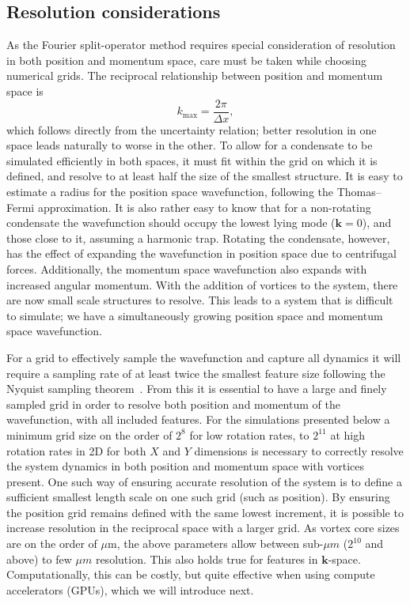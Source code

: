 \subsection{Resolution considerations}
As the Fourier split-operator method requires special consideration of resolution in both position and momentum space, care must be taken while choosing numerical grids. The reciprocal relationship between position and momentum space is \begin{equation}
    k_{\text{max}} = \frac{2\pi}{\Delta x},
\end{equation}
which follows directly from the uncertainty relation; better resolution in one space leads naturally to worse in the other. To allow for a condensate to be simulated efficiently in both spaces, it must fit within the grid on which it is defined, and resolve to at least half the size of the smallest structure. It is easy to estimate a radius for the position space wavefunction, following the Thomas--Fermi approximation. It is also rather easy to know that for a non-rotating condensate the wavefunction should occupy the lowest lying mode ($\mathbf{k}=0$), and those close to it, assuming a harmonic trap. Rotating the condensate, however, has the effect of expanding the wavefunction in position space due to centrifugal forces. Additionally, the momentum space wavefunction also expands with increased angular momentum. With the addition of vortices to the system, there are now small scale structures to resolve. This leads to a system that is difficult to simulate; we have a simultaneously growing position space and momentum space wavefunction.

For a grid to effectively sample the wavefunction and capture all dynamics it will require a sampling rate of at least twice the smallest feature size following the Nyquist sampling theorem~\cite{BK:NumRecipes}. From this it is essential to have a large and finely sampled grid in order to resolve both position and momentum of the wavefunction, with all included features. For the simulations presented below a minimum grid size on the order of $2^8$ for low rotation rates, to $2^{11}$ at high rotation rates in 2D for both $X$ and $Y$ dimensions is necessary to correctly resolve the system dynamics in both position and momentum space with vortices present. One such way of ensuring accurate resolution of the system is to define a sufficient smallest length scale on one such grid (such as position). By ensuring the position grid remains defined with the same lowest increment, it is possible to increase resolution in the reciprocal space with a larger grid. As vortex core sizes are on the order of $\mu$m, the above parameters allow between sub-$\mu m$ ($2^{10}$ and above) to few $\mu m$ resolution. This also holds true for features in $\mathbf{k}$-space. Computationally, this can be costly, but quite effective when using compute accelerators (GPUs), which we will introduce next. %
